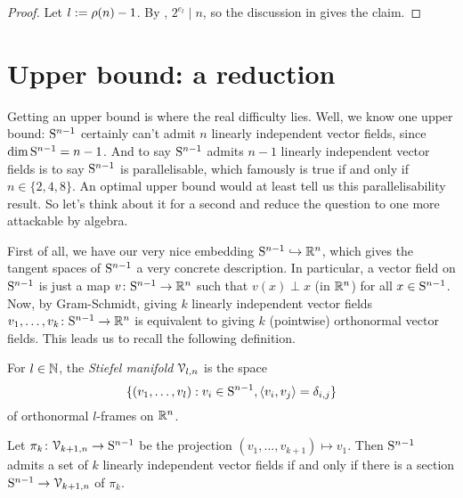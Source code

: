 \begin{proof}
  Let $l \ce \rho(n)-1$. By , $2^{e_l} \mid n$, so the
  discussion in  gives the claim.
\end{proof}


\section{Upper bound: a reduction}

Getting an upper bound is where the real difficulty lies. Well, we
know one upper bound: $\S^{n-1}$ certainly can't admit $n$ linearly
independent vector fields, since $\dim \S^{n-1} = n - 1$. And to say
$\S^{n-1}$ admits $n-1$ linearly independent vector fields is to say
$\S^{n-1}$ is parallelisable, which famously is true if and only if $n
\in \{2,4,8\}$. An optimal upper bound would at least tell us this
parallelisability result. So let's think about it for a second and
reduce the question to one more attackable by algebra.

\begin{nothing}
  \label{gram-schmidt}
  First of all, we have our very nice embedding $\S^{n-1} \inj \R^n$,
  which gives the tangent spaces of $\S^{n-1}$ a very concrete
  description. In particular, a vector field on $\S^{n-1}$ is just a
  map $v \c \S^{n-1} \to \R^n$ such that $v(x) \perp x$ (in $\R^n$)
  for all $x \in \S^{n-1}$. Now, by Gram-Schmidt, giving $k$ linearly
  independent vector fields $v_1,\ldots,v_k \c \S^{n-1} \to \R^n$ is
  equivalent to giving $k$ (pointwise) orthonormal vector fields. This
  leads us to recall the following definition.
\end{nothing}

\begin{definition}
  \label{stiefel}
  For $l \in \N$, the \emph{Stiefel manifold} $\V_{l,n}$ is the space
  \[
  \{(v_1,\ldots,v_l) : v_i \in \S^{n-1}, \langle v_i, v_j \rangle =
  \delta_{i,j}\}
  \]
  of orthonormal $l$-frames on $\R^n$.
\end{definition}

\begin{lemma}
  \label{section-reduction}
  Let $\pi_k \c \V_{k+1,n} \to \S^{n-1}$ be the projection
  $(v_1,\ldots,v_{k+1}) \mapsto v_1$. Then $\S^{n-1}$ admits a set of
  $k$ linearly independent vector fields if and only if there is a
  section $\S^{n-1} \to \V_{k+1,n}$ of $\pi_k$.
\end{lemma}

